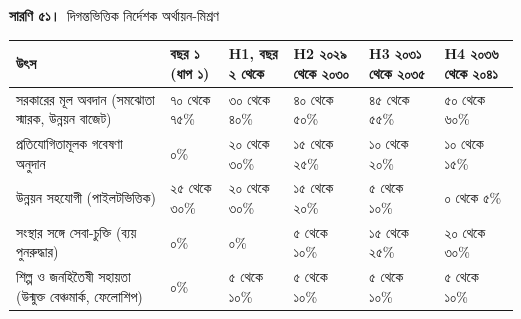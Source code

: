 \documentclass[border=10pt]{standalone}
\begin{document}
\begin{minipage}{22cm}
{\large\bfseries সারণি ৫১।}\ {\large দিগন্তভিত্তিক নির্দেশক অর্থায়ন-মিশ্রণ}\par\vspace{7pt}
\small
{}
\begin{tabularx}{\linewidth}{@{}>{\hsize=1.685\hsize\raggedright\arraybackslash}X>{\hsize=0.809\hsize\raggedright\arraybackslash}X>{\hsize=0.876\hsize\raggedright\arraybackslash}X>{\hsize=0.876\hsize\raggedright\arraybackslash}X>{\hsize=0.876\hsize\raggedright\arraybackslash}X>{\hsize=0.876\hsize\raggedright\arraybackslash}X@{}}
\arrayrulecolor{bapilrule}\toprule
\rowcolor{white}\textbf{উৎস} & \textbf{বছর ১ (ধাপ ১)} & \textbf{H1, বছর ২ থেকে} & \textbf{H2 ২০২৯ থেকে ২০৩০} & \textbf{H3 ২০৩১ থেকে ২০৩৫} & \textbf{H4 ২০৩৬ থেকে ২০৪১} \\
\midrule
সরকারের মূল অবদান (সমঝোতা স্মারক, উন্নয়ন বাজেট) & ৭০ থেকে ৭৫\% & ৩০ থেকে ৪০\% & ৪০ থেকে ৫০\% & ৪৫ থেকে ৫৫\% & ৫০ থেকে ৬০\% \\
প্রতিযোগিতামূলক গবেষণা অনুদান & ০\% & ২০ থেকে ৩০\% & ১৫ থেকে ২৫\% & ১০ থেকে ২০\% & ১০ থেকে ১৫\% \\
উন্নয়ন সহযোগী (পাইলটভিত্তিক) & ২৫ থেকে ৩০\% & ২০ থেকে ৩০\% & ১৫ থেকে ২০\% & ৫ থেকে ১০\% & ০ থেকে ৫\% \\
সংস্থার সঙ্গে সেবা-চুক্তি (ব্যয় পুনরুদ্ধার) & ০\% & ০\% & ৫ থেকে ১০\% & ১৫ থেকে ২৫\% & ২০ থেকে ৩০\% \\
শিল্প ও জনহিতৈষী সহায়তা (উন্মুক্ত বেঞ্চমার্ক, ফেলোশিপ) & ০\% & ৫ থেকে ১০\% & ৫ থেকে ১০\% & ৫ থেকে ১০\% & ৫ থেকে ১০\% \\
\bottomrule
\end{tabularx}
\par\vspace{5pt}{\footnotesize\itshape প্রথম বছর এমন উৎসের ওপর নির্ভর করে, যা মাস ১-এর আগে প্রতিশ্রুত হতে পারে: সরকারি বাজেট ও একটি উন্নয়ন সহযোগী। ল্যাব গঠিত হওয়ার পর গবেষণা অনুদান ও শিল্পখাতের অর্থ আসে। কোনো বছরে সরকার-বহির্ভূত কোনো একক অর্থদাতা বাজেটের ৩০\%-এর বেশি দেবেন না, এবং শিল্পখাতের সহায়তা কখনো গবেষণার ফলাফল বা শাসনগত সিদ্ধান্তে প্রভাব কিনতে পারবে না।}
\par{}
\end{minipage}
\end{document}

